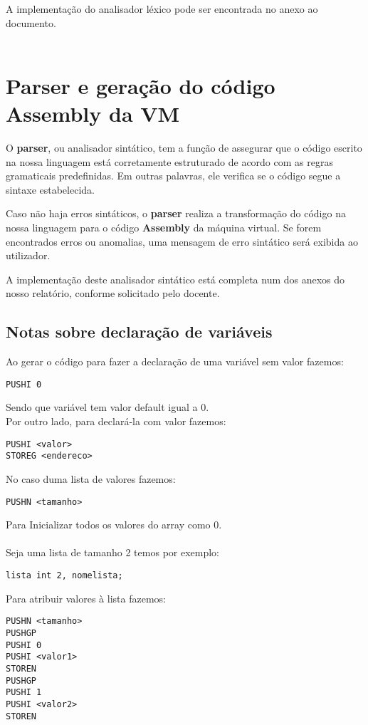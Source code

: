 \documentclass[11pt,a4paper]{report}
\begin{document}
A implementação do analisador léxico pode ser encontrada no anexo ao documento. 
\\ \\

\section{Parser e geração do código Assembly da VM}

O \textbf{parser}, ou analisador sintático, tem a função de assegurar que o código escrito na nossa linguagem está corretamente estruturado de acordo com as regras gramaticais predefinidas. Em outras palavras, ele verifica se o código segue a sintaxe estabelecida. \ \

Caso não haja erros sintáticos, o \textbf{parser} realiza a transformação do código na nossa linguagem para o código \textbf{Assembly} da máquina virtual. Se forem encontrados erros ou anomalias, uma mensagem de erro sintático será exibida ao utilizador. \ \

A implementação deste analisador sintático está completa num dos anexos do nosso relatório, conforme solicitado pelo docente.

\subsection{Notas sobre declaração de variáveis}

Ao gerar o código para fazer a declaração de uma variável sem valor fazemos:
\begin{lstlisting}
PUSHI 0    
\end{lstlisting}
Sendo que variável tem valor default igual a 0.\\

Por outro lado, para declará-la com valor fazemos:
\begin{lstlisting}
PUSHI <valor>
STOREG <endereco>
\end{lstlisting}
No caso duma lista de valores fazemos:
\begin{lstlisting}
PUSHN <tamanho>
\end{lstlisting}
Para Inicializar todos os valores do array como 0.\\ \\
Seja uma lista de tamanho 2 temos por exemplo:
\begin{lstlisting}
lista int 2, nomelista;
\end{lstlisting}
Para atribuir valores à lista fazemos:
\begin{lstlisting}
PUSHN <tamanho>
PUSHGP
PUSHI 0
PUSHI <valor1>
STOREN
PUSHGP
PUSHI 1
PUSHI <valor2>
STOREN
\end{lstlisting}
\end{document}
